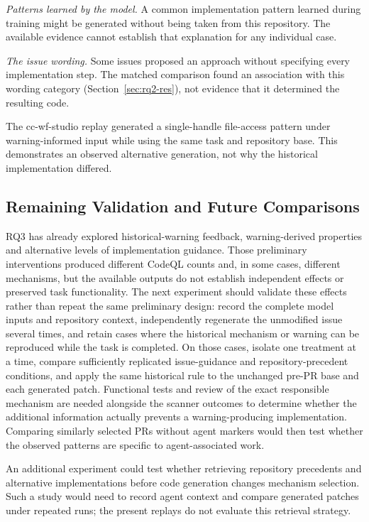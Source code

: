 \documentclass[acmsmall,screen,nonacm]{acmart}
\begin{document}
\emph{Patterns learned by the model.} A common implementation pattern learned during training might be generated without being taken from this repository. The available evidence cannot establish that explanation for any individual case.

\emph{The issue wording.} Some issues proposed an approach without specifying every implementation step. The matched comparison found an association with this wording category (Section~\ref{sec:rq2-res}), not evidence that it determined the resulting code.

The cc-wf-studio replay generated a single-handle file-access pattern under warning-informed input while using the same task and repository base. This demonstrates an observed alternative generation, not why the historical implementation differed.


\subsection{Remaining Validation and Future Comparisons}

RQ3 has already explored historical-warning feedback, warning-derived properties and alternative levels of implementation guidance. Those preliminary interventions produced different CodeQL counts and, in some cases, different mechanisms, but the available outputs do not establish independent effects or preserved task functionality. The next experiment should validate these effects rather than repeat the same preliminary design: record the complete model inputs and repository context, independently regenerate the unmodified issue several times, and retain cases where the historical mechanism or warning can be reproduced while the task is completed. On those cases, isolate one treatment at a time, compare sufficiently replicated issue-guidance and repository-precedent conditions, and apply the same historical rule to the unchanged pre-PR base and each generated patch. Functional tests and review of the exact responsible mechanism are needed alongside the scanner outcomes to determine whether the additional information actually prevents a warning-producing implementation. Comparing similarly selected PRs without agent markers would then test whether the observed patterns are specific to agent-associated work.

An additional experiment could test whether retrieving repository precedents and alternative implementations before code generation changes mechanism selection. Such a study would need to record agent context and compare generated patches under repeated runs; the present replays do not evaluate this retrieval strategy.
\end{document}
